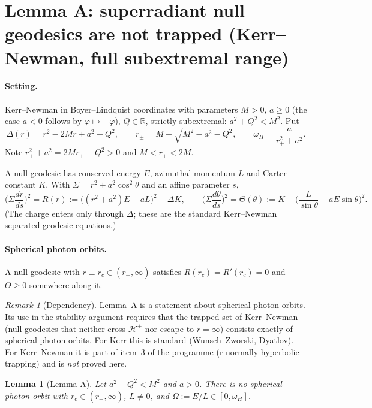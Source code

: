 \documentclass[11pt]{article}
\newtheorem{lemma}{Lemma}\newtheorem{corollary}{Corollary}
\theoremstyle{remark}\newtheorem{remark}{Remark}
\begin{document}
\section*{Lemma A: superradiant null geodesics are not trapped (Kerr--Newman, full subextremal range)}

\paragraph{Setting.} Kerr--Newman in Boyer--Lindquist coordinates with parameters $M>0$, $a\ge 0$ (the case $a<0$ follows by $\varphi\mapsto-\varphi$), $Q\in\mathbb R$, strictly subextremal: $a^2+Q^2<M^2$. Put
\[
\Delta(r)=r^2-2Mr+a^2+Q^2,\qquad r_\pm=M\pm\sqrt{M^2-a^2-Q^2},\qquad \omega_H=\frac{a}{r_+^2+a^2}.
\]
Note $r_+^2+a^2=2Mr_+-Q^2>0$ and $M<r_+<2M$.

A null geodesic has conserved energy $E$, azimuthal momentum $L$ and Carter constant $K$. With $\Sigma=r^2+a^2\cos^2\theta$ and an affine parameter $s$,
\begin{equation}\label{eq:RT}
\Big(\Sigma\frac{dr}{ds}\Big)^2=R(r):=\big((r^2+a^2)E-aL\big)^2-\Delta K,\qquad
\Big(\Sigma\frac{d\theta}{ds}\Big)^2=\Theta(\theta):=K-\Big(\frac{L}{\sin\theta}-aE\sin\theta\Big)^2 .
\end{equation}
(The charge enters only through $\Delta$; these are the standard Kerr--Newman separated geodesic equations.)

\paragraph{Spherical photon orbits.} A null geodesic with $r\equiv r_c\in(r_+,\infty)$ satisfies $R(r_c)=R'(r_c)=0$ and $\Theta\ge0$ somewhere along it.

\begin{remark}[Dependency]
Lemma~A is a statement about spherical photon orbits. Its use in the stability argument requires that the trapped set of Kerr--Newman (null geodesics that neither cross $\mathcal H^+$ nor escape to $r=\infty$) consists exactly of spherical photon orbits. For Kerr this is standard (Wunsch--Zworski, Dyatlov). For Kerr--Newman it is part of item~3 of the programme (r-normally hyperbolic trapping) and is \emph{not} proved here.
\end{remark}

\begin{lemma}[Lemma A]\label{lem:A}
Let $a^2+Q^2<M^2$ and $a>0$. There is no spherical photon orbit with $r_c\in(r_+,\infty)$, $L\neq0$, and $\Omega:=E/L\in[0,\omega_H]$.
\end{lemma}
\end{document}
